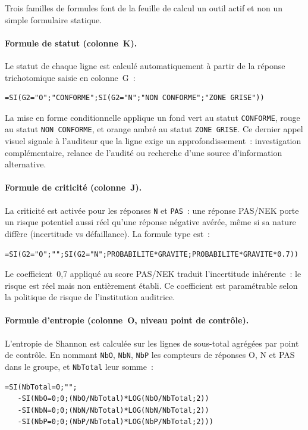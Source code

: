 Trois familles de formules font de la feuille de calcul un outil actif et non
un simple formulaire statique.

\paragraph{Formule de statut (colonne~K).}
Le statut de chaque ligne est calculé automatiquement à partir de la réponse
trichotomique saisie en colonne~G~:

\begin{verbatim}
=SI(G2="O";"CONFORME";SI(G2="N";"NON CONFORME";"ZONE GRISE"))
\end{verbatim}

La mise en forme conditionnelle applique un fond vert au statut
\texttt{CONFORME}, rouge au statut \texttt{NON~CONFORME}, et orange ambré au
statut \texttt{ZONE~GRISE}. Ce dernier appel visuel signale à l'auditeur que la
ligne exige un approfondissement~: investigation complémentaire, relance de
l'audité ou recherche d'une source d'information alternative.

\paragraph{Formule de criticité (colonne~J).}
La criticité est activée pour les réponses \texttt{N} et \texttt{PAS}~: une
réponse PAS/NEK porte un risque potentiel aussi réel qu'une réponse négative
avérée, même si sa nature diffère (incertitude vs défaillance). La formule
type est~:

\begin{verbatim}
=SI(G2="O";"";SI(G2="N";PROBABILITE*GRAVITE;PROBABILITE*GRAVITE*0.7))
\end{verbatim}

Le coefficient~0,7 appliqué au score PAS/NEK traduit l'incertitude
inhérente~: le risque est réel mais non entièrement établi. Ce coefficient est
paramétrable selon la politique de risque de l'institution auditrice.

\paragraph{Formule d'entropie (colonne~O, niveau point de contrôle).}
L'entropie de Shannon est calculée sur les lignes de sous-total agrégées par
point de contrôle. En nommant \texttt{NbO}, \texttt{NbN}, \texttt{NbP} les
compteurs de réponses O, N et PAS dans le groupe, et \texttt{NbTotal} leur
somme~:

\begin{verbatim}
=SI(NbTotal=0;"";
   -SI(NbO=0;0;(NbO/NbTotal)*LOG(NbO/NbTotal;2))
   -SI(NbN=0;0;(NbN/NbTotal)*LOG(NbN/NbTotal;2))
   -SI(NbP=0;0;(NbP/NbTotal)*LOG(NbP/NbTotal;2)))
\end{verbatim}

